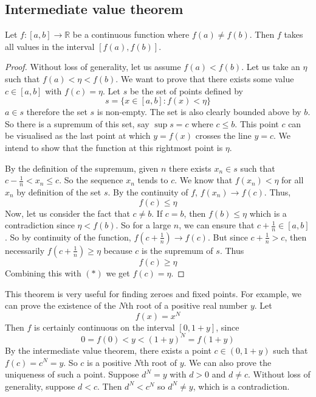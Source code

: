 \subsection{Intermediate value theorem}
\begin{theorem}
	Let \(f \colon [a, b] \to \mathbb R\) be a continuous function where \(f(a) \neq f(b)\).
	Then \(f\) takes all values in the interval \([f(a), f(b)]\).
\end{theorem}
\begin{proof}
	Without loss of generality, let us assume \(f(a) < f(b)\).
	Let us take an \(\eta\) such that \(f(a) < \eta < f(b)\).
	We want to prove that there exists some value \(c \in [a, b]\) with \(f(c) = \eta\).
	Let \(s\) be the set of points defined by
	\[
		s = \{ x \in [a, b] \colon f(x) < \eta \}
	\]
	\(a \in s\) therefore the set \(s\) is non-empty.
	The set is also clearly bounded above by \(b\).
	So there is a supremum of this set, say \(\sup s = c\) where \(c \leq b\).
	This point \(c\) can be visualised as the last point at which \(y=f(x)\) crosses the line \(y=c\).
	We intend to show that the function at this rightmost point is \(\eta\).

	By the definition of the supremum, given \(n\) there exists \(x_n \in s\) such that \(c - \frac{1}{n} < x_n \leq c\).
	So the sequence \(x_n\) tends to \(c\).
	We know that \(f(x_n) < \eta\) for all \(x_n\) by definition of the set \(s\).
	By the continuity of \(f\), \(f(x_n) \to f(c)\).
	Thus,
	\begin{equation}
		f(c) \leq \eta \tag{\(\ast\)}
	\end{equation}
	Now, let us consider the fact that \(c \neq b\).
	If \(c = b\), then \(f(b) \leq \eta\) which is a contradiction since \(\eta < f(b)\).
	So for a large \(n\), we can ensure that \(c + \frac{1}{n} \in [a,b]\).
	So by continuity of the function, \(f(c + \frac{1}{n}) \to f(c)\).
	But since \(c + \frac{1}{n} > c\), then necessarily \(f(c + \frac{1}{n}) \geq \eta\) because \(c\) is the supremum of \(s\).
	Thus
	\[
		f(c) \geq \eta
	\]
	Combining this with \((\ast)\) we get \(f(c) = \eta\).
\end{proof}
This theorem is very useful for finding zeroes and fixed points.
For example, we can prove the existence of the \(N\)th root of a positive real number \(y\).
Let
\[
	f(x) = x^N
\]
Then \(f\) is certainly continuous on the interval \([0, 1+y]\), since
\[
	0 = f(0) < y < (1+y)^N = f(1 + y)
\]
By the intermediate value theorem, there exists a point \(c \in (0, 1+y)\) such that \(f(c) = c^N = y\).
So \(c\) is a positive \(N\)th root of \(y\).
We can also prove the uniqueness of such a point.
Suppose \(d^N = y\) with \(d>0\) and \(d \neq c\).
Without loss of generality, suppose \(d < c\).
Then \(d^N < c^N\) so \(d^N \neq y\), which is a contradiction.

